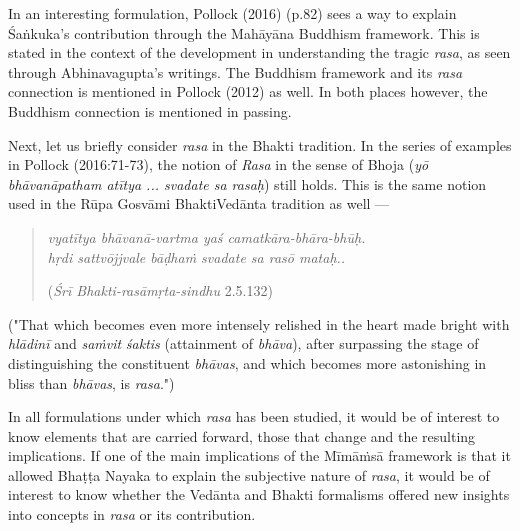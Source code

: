 In an interesting formulation, Pollock (2016) (p.82) sees a way to explain Śaṅkuka’s contribution through the Mahāyāna Buddhism framework. This is stated in the context of the development in understanding the tragic \textsl{rasa}, as seen through Abhinavagupta’s writings. The Buddhism framework and its \textsl{rasa} connection is mentioned in Pollock (2012) as well. In both places however, the Buddhism connection is mentioned in passing. 

Next, let us briefly consider \textsl{rasa} in the Bhakti tradition. In the series of examples in Pollock (2016:71-73), the notion of \textsl{Rasa} in the sense of Bhoja (\textsl{yō bhāvanāpatham atītya ... svadate sa rasaḥ}) still holds. This is the same notion used in the Rūpa Gosvāmi BhaktiVedānta
 tradition as well --- 

\newpage
\begin{quote}
\textsl{vyatītya bhāvanā-vartma yaś camatkāra-bhāra-bhūḥ.}\\
\textsl{hṛdi sattvōjjvale bāḍhaṁ svadate sa rasō mataḥ..}

\hfill (\textsl{Śrī Bhakti-rasāmṛta-sindhu} 2.5.132)
\end{quote}

("That which becomes even more intensely relished in the heart made bright with \textsl{hlādinī} and \textsl{saṁvit} \textsl{śaktis} (attainment of \textsl{bhāva}), after surpassing the stage of distinguishing the constituent \textsl{bhāvas}, and which becomes more astonishing in bliss than \textsl{bhāvas}, is \textsl{rasa}.")

In all formulations under which \textsl{rasa} has been studied, it would be of interest to know elements that are carried forward, those that change and the resulting implications. If one of the main implications of the Mīmāṁsā framework is that it allowed Bhaṭṭa Nayaka to explain the subjective nature of \textsl{rasa}, it would be of interest to know whether the Vedānta and Bhakti formalisms offered new insights into concepts in \textsl{rasa} or its contribution. 

